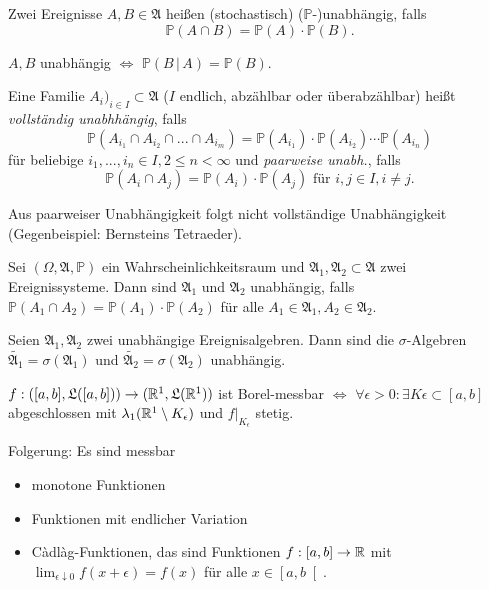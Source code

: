 \documentclass{cheat-sheet}
\newcommand{\Alg}{\mathfrak{A}}
\newcommand{\LebAlg}{\mathfrak{L}} %
\renewcommand{\P}{\mathbb{P}}
\newcommand{\PD}[2]{\P(#1\,|\,#2)}
\begin{document}
\begin{defn}
  Zwei Ereignisse $A, B \in \Alg$ heißen (stochastisch) ($\P$-)unabhängig, falls
  \[ \P(A \cap B) = \P(A) \cdot \P(B). \]
\end{defn}

\begin{satz}
  $A, B$ unabhängig $\iff$ $\PD{B}{A} = \P(B)$.
\end{satz}

\begin{defn}
  Eine Familie $A_i)_{i \in I} \subset \Alg$ ($I$ endlich, abzählbar oder überabzählbar) heißt \emph{vollständig unabhhängig}, falls
  \[ \P(A_{i_1} \cap A_{i_2} \cap ... \cap A_{i_m}) = \P(A_{i_1}) \cdot \P(A_{i_2}) \cdots \P(A_{i_n}) \]
  für beliebige $i_1, ..., i_n \in I, 2 \leq n < \infty$ und \emph{paarweise unabh.}, falls
  \[ \P(A_i \cap A_j) = \P(A_i) \cdot \P(A_j) \text{ für } i, j \in I, i \not= j. \]
\end{defn}

\begin{acht}
  Aus paarweiser Unabhängigkeit folgt nicht vollständige Unabhängigkeit (Gegenbeispiel: Bernsteins Tetraeder).
\end{acht}

\begin{defn}
  Sei $(\Omega, \Alg, \P)$ ein Wahrscheinlichkeitsraum und $\Alg_1, \Alg_2 \subset \Alg$ zwei Ereignissysteme. Dann sind $\Alg_1$ und $\Alg_2$ unabhängig, falls $\P(A_1 \cap A_2) = \P(A_1) \cdot \P(A_2)$ für alle $A_1 \in \Alg_1, A_2 \in \Alg_2$.
\end{defn}

\begin{satz}
  Seien $\Alg_1, \Alg_2$ zwei unabhängige Ereignisalgebren. Dann sind die $\sigma$-Algebren $\tilde{\Alg_1} = \sigma(\Alg_1)$ und $\tilde{\Alg_2} = \sigma(\Alg_2)$ unabhängig.
\end{satz}


\begin{satz}
  $f : ([a, b], \LebAlg([a, b])) \to (\R^1, \LebAlg(\R^1))$ ist Borel-messbar $\iff$ $\forall \epsilon > 0 : \exists K\epsilon \subset [a, b]$ abgeschlossen mit $\lambda_1(\mathbb{R}^1 \setminus K_\epsilon)$ und $f|_{K_\epsilon}$ stetig.
\end{satz}

\begin{satz}
  Folgerung: Es sind messbar
  \begin{itemize}
    \item monotone Funktionen
    \item Funktionen mit endlicher Variation
    \item Càdlàg-Funktionen, das sind Funktionen $f : [a, b] \to \mathbb{R}$ mit $\lim_{\epsilon \downarrow 0} f(x+\epsilon) = f(x)$ für alle $x \in \left[a, b\right[$.
  \end{itemize}
\end{satz}
\end{document}
